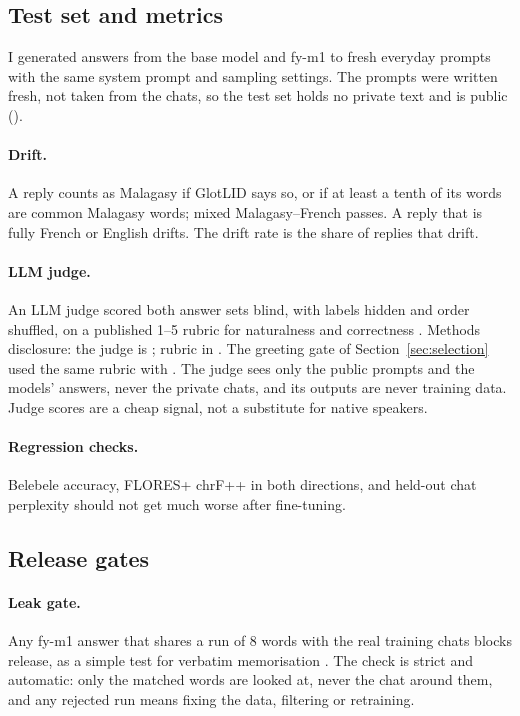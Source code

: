\documentclass[11pt]{article}
\begin{document}
\subsection{Test set and metrics}
\label{sec:metrics}
I generated answers from the base model and fy-m1 to \fyEvalPrompts{} fresh everyday prompts with the
same system prompt and sampling settings. The prompts were written fresh, not taken from the chats, so
the test set holds no private text and is public ().

\paragraph{Drift.} A reply counts as Malagasy if GlotLID \citep{kargaran-etal-2023-glotlid} says so, or
if at least a tenth of its words are common Malagasy words; mixed Malagasy--French passes. A reply that
is fully French or English drifts. The drift rate is the share of replies that drift.

\paragraph{LLM judge.} An LLM judge scored both answer sets blind, with labels hidden and order shuffled,
on a published 1--5 rubric for naturalness and correctness \citep{zheng2023judging}. Methods disclosure:
the judge is \fyJudgeModel{}; rubric in . The greeting gate of
Section~\ref{sec:selection} used the same rubric with \fyGreetJudge{}. The judge sees only the public
prompts and the models' answers, never the private chats, and its outputs are never training data. Judge
scores are a cheap signal, not a substitute for native speakers.

\paragraph{Regression checks.} Belebele accuracy, FLORES+ chrF++ in both directions, and held-out chat
perplexity should not get much worse after fine-tuning.

\subsection{Release gates}
\label{sec:gates}
\paragraph{Leak gate.} Any fy-m1 answer that shares a run of 8 words with the real training chats blocks
release, as a simple test for verbatim memorisation \citep{carlini2021extracting}. The check is strict and
automatic: only the matched words are looked at, never the chat around them, and any rejected run means
fixing the data, filtering or retraining.
\end{document}
